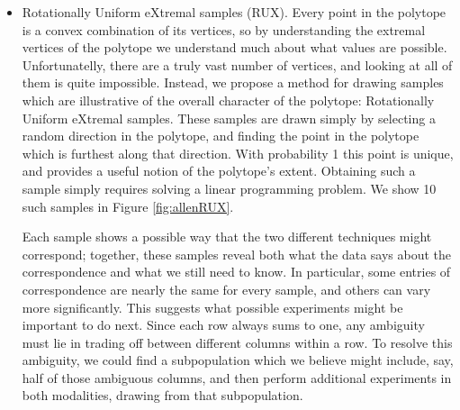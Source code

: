 \begin{itemize}
    \item Rotationally Uniform eXtremal samples (RUX).  Every point in the polytope is a convex combination of its vertices, so by understanding the extremal vertices of the polytope we understand much about what values are possible.  Unfortunatelly, there are a truly vast number of vertices, and looking at all of them is quite impossible.  Instead, we propose a method for drawing samples which are illustrative of the overall character of the polytope: Rotationally Uniform eXtremal samples.  These samples are drawn simply by selecting a random direction in the polytope, and finding the point in the polytope which is furthest along that direction.  With probability 1 this point is unique, and provides a useful notion of the polytope's extent.  Obtaining such a sample simply requires solving a linear programming problem.  We show 10 such samples in Figure \ref{fig:allenRUX}.  

    Each sample shows a possible way that the two different techniques might correspond; together, these samples reveal both what the data says about the correspondence and what we still need to know.  In particular, some entries of correspondence are nearly the same for every sample, and others can vary more significantly.  This suggests what possible experiments might be important to do next.  Since each row always sums to one, any ambiguity must lie in trading off between different columns within a row.  To resolve this ambiguity, we could find a subpopulation which we believe might include, say, half of those ambiguous columns, and then perform additional experiments in both modalities, drawing from that subpopulation.


\end{itemize}
